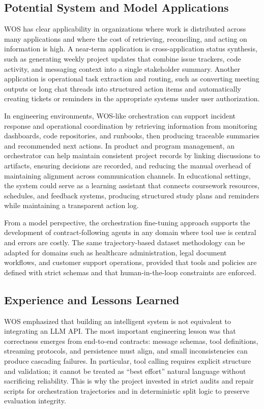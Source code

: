 \documentclass[conference]{IEEEtran}
\begin{document}
\subsection{Potential System and Model Applications}
WOS has clear applicability in organizations where work is distributed across many applications and where the cost of retrieving, reconciling, and acting on information is high. A near-term application is cross-application status synthesis, such as generating weekly project updates that combine issue trackers, code activity, and messaging context into a single stakeholder summary. Another application is operational task extraction and routing, such as converting meeting outputs or long chat threads into structured action items and automatically creating tickets or reminders in the appropriate systems under user authorization.

In engineering environments, WOS-like orchestration can support incident response and operational coordination by retrieving information from monitoring dashboards, code repositories, and runbooks, then producing traceable summaries and recommended next actions. In product and program management, an orchestrator can help maintain consistent project records by linking discussions to artifacts, ensuring decisions are recorded, and reducing the manual overhead of maintaining alignment across communication channels. In educational settings, the system could serve as a learning assistant that connects coursework resources, schedules, and feedback systems, producing structured study plans and reminders while maintaining a transparent action log.

From a model perspective, the orchestration fine-tuning approach supports the development of contract-following agents in any domain where tool use is central and errors are costly. The same trajectory-based dataset methodology can be adapted for domains such as healthcare administration, legal document workflows, and customer support operations, provided that tools and policies are defined with strict schemas and that human-in-the-loop constraints are enforced.

\subsection{Experience and Lessons Learned}
WOS emphasized that building an intelligent system is not equivalent to integrating an LLM API. The most important engineering lesson was that correctness emerges from end-to-end contracts: message schemas, tool definitions, streaming protocols, and persistence must align, and small inconsistencies can produce cascading failures. In particular, tool calling requires explicit structure and validation; it cannot be treated as “best effort” natural language without sacrificing reliability. This is why the project invested in strict audits and repair scripts for orchestration trajectories and in deterministic split logic to preserve evaluation integrity.
\end{document}
